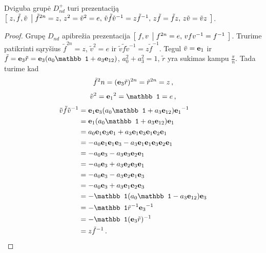 \begin{proposition}
	Dviguba grupė $D_{nd}^+$ turi prezentaciją
	$\left[\; z,\tilde f,\tilde v \;\left|\; 
		\tilde f^{2n}=z,\,
		z^2=\tilde v^2=e,\,
		\tilde v\tilde f\tilde v^{-1}=z\tilde f^{-1},\,
		z\tilde f=\tilde fz,\,
		z\tilde v=\tilde vz
	 \;\right.\right]$.
\end{proposition}
\begin{proof}
	Grupę $D_{nd}$ apibrežia prezentacija $\left[\; f,v \;\left|\; f^{2n}=e,\, vfv^{-1}=f^{-1} \;\right.\right]$.
	Trurime patikrinti sąryšius $\tilde f^{2n}=z$, $\tilde v^2=e$ ir $\tilde v\tilde f\tilde v^{-1}=z\tilde f^{-1}$.
	Tegul $\tilde v = \vb e_1$ ir
	$\tilde f = \vb e_3 \tilde r = \vb e_3 (a_0\mathbb1 + a_3 \vb e_{12})$, $a_0^2 + a_3^2 = 1$,
	$\tilde r$ yra sukimas kampu $\frac{\pi}{n}$.
	Tada turime kad
	\begin{equation}
		\tilde f^2n = (\vb e_3 \tilde r)^{2n} 
		= \tilde r^{2n} = z
		\,,
	\end{equation}
	\begin{equation}
		\tilde v^2 = {\vb e_1}^2 = \mathbb1 = e
		\,,
	\end{equation}
	\begin{equation}
		\begin{aligned}
			\tilde v\tilde f\tilde v^{-1}
			&=\vb e_1 \vb e_3 (a_0\mathbb1 + a_3 \vb e_{12}) {\vb e_1}^{-1}
			\\&=\vb e_1 (a_0\mathbb1 + a_3 \vb e_{12}) \vb e_1
			\\&=a_0 \vb e_1 \vb e_3 \vb e_1 + a_3 \vb e_1 \vb e_3 \vb e_1 \vb e_2 \vb e_1
			\\&= - a_0 \vb e_1 \vb e_1 \vb e_3 - a_3 \vb e_1 \vb e_1 \vb e_3 \vb e_2 \vb e_1
			\\&= - a_0 \vb e_3 - a_3 \vb e_3 \vb e_2 \vb e_1
			\\&= - a_0 \vb e_3 + a_3 \vb e_2 \vb e_3 \vb e_1
			\\&= - a_0 \vb e_3 - a_3 \vb e_2 \vb e_1 \vb e_3 
			\\&= - a_0 \vb e_3 + a_3 \vb e_1 \vb e_2 \vb e_3 
			\\&= -\mathbb1( a_0 \mathbb1 - a_3 \vb e_{12}) \vb e_3 
			\\&= -\mathbb1 \tilde r^{-1} {\vb e_3}^{-1} 
			\\&= -\mathbb1 (\vb e_3 \tilde r)^{-1}
			\\&=z\tilde f^{-1}
			\,.
		\end{aligned}
	\end{equation}
\end{proof}

